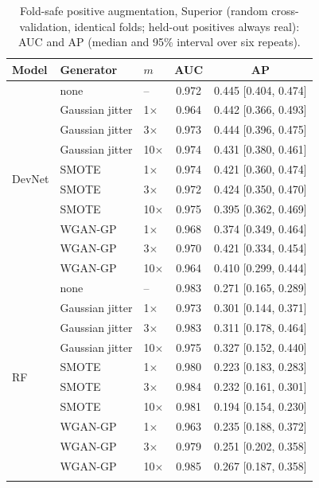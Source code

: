 \documentclass[pdflatex,sn-apa]{sn-jnl}
\begin{document}
\begin{table}[t]
\caption{Fold-safe positive augmentation, Superior (random cross-validation, identical folds; held-out positives always real): AUC and AP (median and 95\% interval over six repeats).}\label{tab:augmentation}
\footnotesize
\begin{tabular*}{0.8\textwidth}{@{\extracolsep\fill}lllcc}
\toprule
Model & Generator & $m$ & AUC & AP \\
\midrule
\multirow{10}{*}{DevNet} & none & -- & 0.972 & 0.445 [0.404, 0.474] \\
 & Gaussian jitter & 1$\times$ & 0.964 & 0.442 [0.366, 0.493] \\
 & Gaussian jitter & 3$\times$ & 0.973 & 0.444 [0.396, 0.475] \\
 & Gaussian jitter & 10$\times$ & 0.974 & 0.431 [0.380, 0.461] \\
 & SMOTE & 1$\times$ & 0.974 & 0.421 [0.360, 0.474] \\
 & SMOTE & 3$\times$ & 0.972 & 0.424 [0.350, 0.470] \\
 & SMOTE & 10$\times$ & 0.975 & 0.395 [0.362, 0.469] \\
 & WGAN-GP & 1$\times$ & 0.968 & 0.374 [0.349, 0.464] \\
 & WGAN-GP & 3$\times$ & 0.970 & 0.421 [0.334, 0.454] \\
 & WGAN-GP & 10$\times$ & 0.964 & 0.410 [0.299, 0.444] \\
\midrule
\multirow{10}{*}{RF} & none & -- & 0.983 & 0.271 [0.165, 0.289] \\
 & Gaussian jitter & 1$\times$ & 0.973 & 0.301 [0.144, 0.371] \\
 & Gaussian jitter & 3$\times$ & 0.983 & 0.311 [0.178, 0.464] \\
 & Gaussian jitter & 10$\times$ & 0.975 & 0.327 [0.152, 0.440] \\
 & SMOTE & 1$\times$ & 0.980 & 0.223 [0.183, 0.283] \\
 & SMOTE & 3$\times$ & 0.984 & 0.232 [0.161, 0.301] \\
 & SMOTE & 10$\times$ & 0.981 & 0.194 [0.154, 0.230] \\
 & WGAN-GP & 1$\times$ & 0.963 & 0.235 [0.188, 0.372] \\
 & WGAN-GP & 3$\times$ & 0.979 & 0.251 [0.202, 0.358] \\
 & WGAN-GP & 10$\times$ & 0.985 & 0.267 [0.187, 0.358] \\
\botrule
\end{tabular*}
\end{table}
\end{document}
